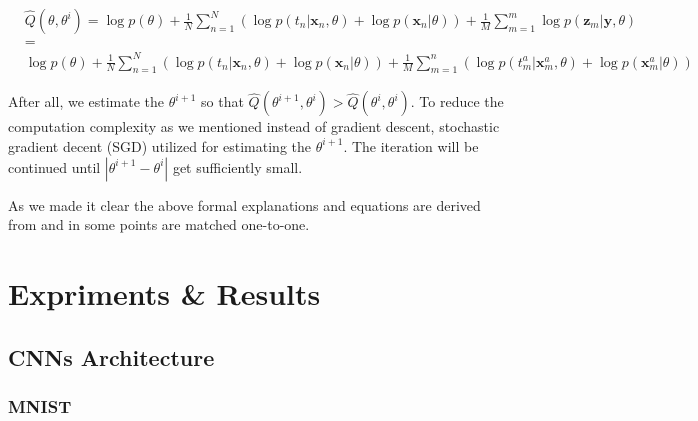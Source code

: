 \begin{equation}
  \begin{aligned}
     & \hat{Q}\left(\theta, \theta^{i}\right)=\log p(\theta)+\frac{1}{N} \sum_{n=1}^{N}\left(\log p\left(t_{n} | \mathbf{x}_{n}, \theta\right)+\log p\left(\mathbf{x}_{n} | \theta\right)\right)+\frac{1}{M} \sum_{m=1}^{m} \log p\left(\mathbf{z}_{m} | \mathbf{y}, \theta\right) \\
     & =                                                                                                                                                                                                                                                                           \\
     & \log p(\theta)+\frac{1}{N} \sum_{n=1}^{N}\left(\log p\left(t_{n} | \mathbf{x}_{n}, \theta\right)+\log p\left(\mathbf{x}_{n} | \theta\right)\right)+\frac{1}{M}
    \sum_{m=1}^{n}\left(\log p\left(t_{m}^{a} | \mathbf{x}_{m}^{a}, \theta\right)+\log p\left(\mathbf{x}_{m}^{a} | \theta\right)\right)
  \end{aligned}
\end{equation}

After all, we estimate the $\theta^{i +1}$ so that $\hat{Q}(\theta^{i +1}, \theta^{i}) >
\hat{Q}(\theta^{i}, \theta^{i})$. To reduce the computation complexity as we mentioned instead of
gradient descent, stochastic gradient decent (SGD) utilized for estimating the $\theta^{i +1}$. The
iteration will be continued until $|\theta^{i +1} - \theta^{i}|$ get sufficiently small. 

As we made it clear the above formal explanations and equations are derived from \cite{bayesian_approach} and in some points are matched one-to-one.  


\chapter{Expriments \& Results}
\section{CNNs Architecture}

\subsection{MNIST}
